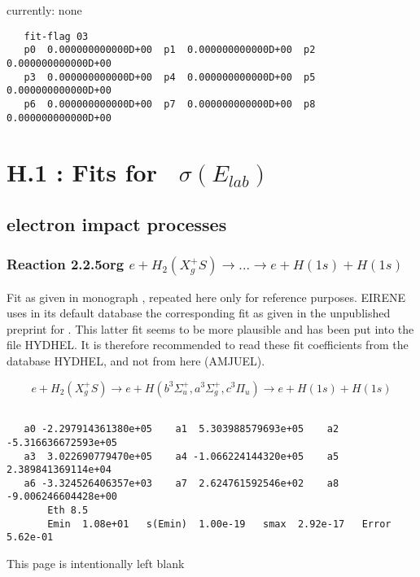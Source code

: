 \documentclass[12pt,dvipdfmx]{article}
\begin{document}
currently: none

\begin{small}\begin{verbatim}
   fit-flag 03
   p0  0.000000000000D+00  p1  0.000000000000D+00  p2  0.000000000000D+00
   p3  0.000000000000D+00  p4  0.000000000000D+00  p5  0.000000000000D+00
   p6  0.000000000000D+00  p7  0.000000000000D+00  p8  0.000000000000D+00
\end{verbatim}\end{small}


\newpage

\section{H.1 :  Fits for  \    $\sigma(E_{lab})$}\label{sect1}


\subsection{electron impact processes}
\subsubsection{
Reaction 2.2.5org
$ e + H_2(X_g^+S) \rightarrow . . . \rightarrow e + H(1s) + H(1s) $ }

Fit as given in monograph \cite{kn:Janev}, repeated here only for reference purposes.
EIRENE uses in its default database the corresponding fit as given in the unpublished preprint for
\cite{kn:Janev}.
This latter fit seems to be more plausible and has been put
into the file HYDHEL.
It is therefore recommended to read these
fit coefficients from the database HYDHEL, and not from here (AMJUEL).





\begin{displaymath}
 e + H_2(X_g^+ S) \rightarrow e + H(b^3\Sigma^+_u , a^3\Sigma^+_g,
c^3\Pi_u)
             \rightarrow e + H(1s) + H(1s)
\end{displaymath}


\begin{small}\begin{verbatim}

   a0 -2.297914361380e+05    a1  5.303988579693e+05    a2 -5.316636672593e+05
   a3  3.022690779470e+05    a4 -1.066224144320e+05    a5  2.389841369114e+04
   a6 -3.324526406357e+03    a7  2.624761592546e+02    a8 -9.006246604428e+00
       Eth 8.5
       Emin  1.08e+01   s(Emin)  1.00e-19   smax  2.92e-17   Error  5.62e-01
\end{verbatim}\end{small}
\newpage
This page is intentionally left blank
\newpage
\end{document}
